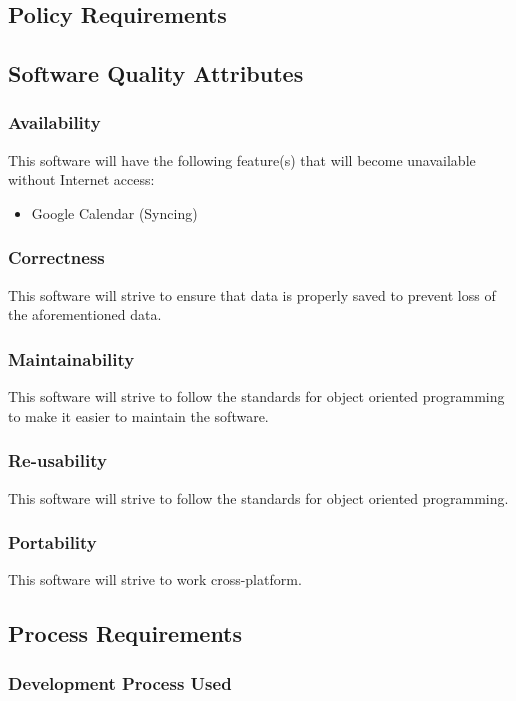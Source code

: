 \documentclass[12pt]{article}
\begin{document}
\subsection{Policy Requirements}

\subsection{Software Quality Attributes}

\subsubsection{Availability}
This software will have the following feature(s) that will become unavailable without Internet access:
\begin{itemize}
\item Google Calendar (Syncing)
\end{itemize}
\subsubsection{Correctness}
This software will strive to ensure that data is properly saved to prevent loss of the aforementioned data.
\subsubsection{Maintainability}
This software will strive to follow the standards for object oriented programming to make it easier to maintain the software.

\subsubsection{Re-usability}
 This software will strive to follow the standards for object oriented programming. 
\subsubsection{Portability }
This software will strive to work cross-platform. 

\subsection{Process Requirements}

\subsubsection{Development Process Used}
\end{document}
